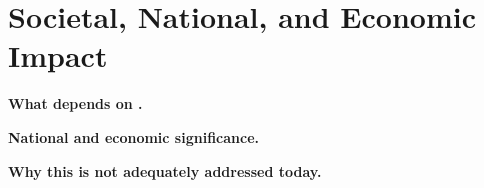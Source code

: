 \section{Societal, National, and Economic Impact}


\noindent\textbf{What depends on \ose{}.}

\noindent\textbf{National and economic significance.}

\noindent\textbf{Why this is not adequately addressed today.}

